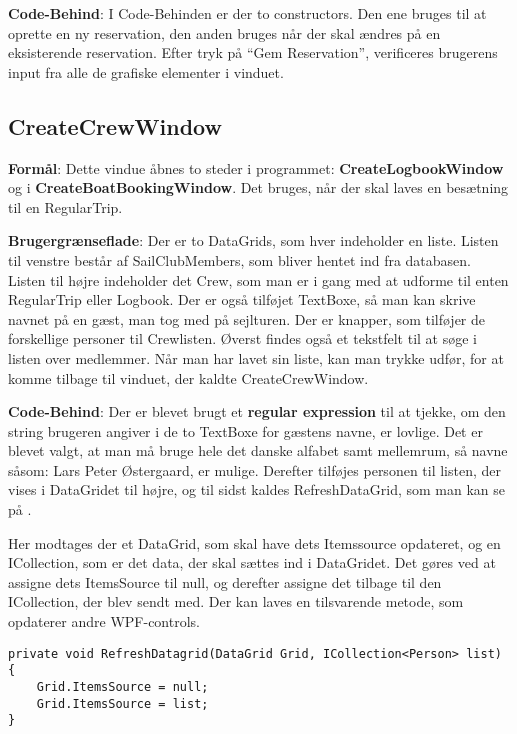 \textbf{Code-Behind}: 
I Code-Behinden er der to constructors. 
Den ene bruges til at oprette en ny reservation, den anden bruges når der skal ændres på en eksisterende reservation. 
Efter tryk på ``Gem Reservation'', verificeres brugerens input fra alle de grafiske elementer i vinduet.

\subsection{CreateCrewWindow}

\textbf{Formål}: Dette vindue åbnes to steder i programmet: \textbf{CreateLogbookWindow} og i \textbf{CreateBoatBookingWindow}. 
Det bruges, når der skal laves en besætning til en RegularTrip.  

\textbf{Brugergrænseflade}: 
Der er to DataGrids, som hver indeholder en liste. 
Listen til venstre består af SailClubMembers, som bliver hentet ind fra databasen. 
Listen til højre indeholder det Crew, som man er i gang med at udforme til enten RegularTrip eller Logbook. 
Der er også tilføjet TextBoxe, så man kan skrive navnet på en gæst, man tog med på sejlturen. 
Der er knapper, som tilføjer de forskellige personer til Crewlisten. 
Øverst findes også et tekstfelt til at søge i listen over medlemmer. 
Når man har lavet sin liste, kan man trykke udfør, for at komme tilbage til vinduet, der kaldte CreateCrewWindow.

\textbf{Code-Behind}: 
Der er blevet brugt et \textbf{regular expression} til at tjekke, om den string brugeren angiver i de to TextBoxe for gæstens navne, er lovlige. 
Det er blevet valgt, at man må bruge hele det danske alfabet samt mellemrum, så navne såsom: Lars Peter Østergaard, er mulige.
Derefter tilføjes personen til listen, der vises i DataGridet til højre, og til sidst kaldes RefreshDataGrid, som man kan se på .

Her modtages der et DataGrid, som skal have dets Itemssource opdateret, og en ICollection, som er det data, der skal sættes ind i DataGridet. 
Det gøres ved at assigne dets ItemsSource til null, og derefter assigne det tilbage til den ICollection, der blev sendt med. 
Der kan laves en tilsvarende metode, som opdaterer andre WPF-controls.

\begin{lstlisting}[frame=single, caption=Refresh Datagrid, label=RefreshDatagrid]
private void RefreshDatagrid(DataGrid Grid, ICollection<Person> list)
{
    Grid.ItemsSource = null;
    Grid.ItemsSource = list;
}
\end{lstlisting}

